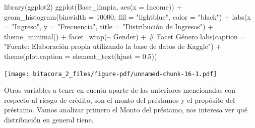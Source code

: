 \documentclass[
  letterpaper,
  DIV=11,
  numbers=noendperiod]{scrreprt}
\newenvironment{Shaded}{\begin{snugshade}}{\end{snugshade}}
\newcommand{\AttributeTok}[1]{\textcolor[rgb]{0.40,0.45,0.13}{#1}}
\newcommand{\CommentTok}[1]{\textcolor[rgb]{0.37,0.37,0.37}{#1}}
\newcommand{\DecValTok}[1]{\textcolor[rgb]{0.68,0.00,0.00}{#1}}
\newcommand{\FloatTok}[1]{\textcolor[rgb]{0.68,0.00,0.00}{#1}}
\newcommand{\FunctionTok}[1]{\textcolor[rgb]{0.28,0.35,0.67}{#1}}
\newcommand{\NormalTok}[1]{\textcolor[rgb]{0.00,0.23,0.31}{#1}}
\newcommand{\SpecialCharTok}[1]{\textcolor[rgb]{0.37,0.37,0.37}{#1}}
\newcommand{\StringTok}[1]{\textcolor[rgb]{0.13,0.47,0.30}{#1}}
\begin{document}
\begin{Shaded}
\begin{Highlighting}[]
\FunctionTok{library}\NormalTok{(ggplot2)}
\FunctionTok{ggplot}\NormalTok{(Base\_limpia, }\FunctionTok{aes}\NormalTok{(}\AttributeTok{x =}\NormalTok{ Income)) }\SpecialCharTok{+} 
  \FunctionTok{geom\_histogram}\NormalTok{(}\AttributeTok{binwidth =} \DecValTok{10000}\NormalTok{, }\AttributeTok{fill =} \StringTok{"lightblue"}\NormalTok{, }\AttributeTok{color =} \StringTok{"black"}\NormalTok{) }\SpecialCharTok{+} 
  \FunctionTok{labs}\NormalTok{(}\AttributeTok{x =} \StringTok{"Ingreso"}\NormalTok{, }\AttributeTok{y =} \StringTok{"Frecuencia"}\NormalTok{, }\AttributeTok{title =} \StringTok{"Distribución de Ingresos"}\NormalTok{) }\SpecialCharTok{+} \FunctionTok{theme\_minimal}\NormalTok{() }\SpecialCharTok{+}
  \FunctionTok{facet\_wrap}\NormalTok{(}\SpecialCharTok{\textasciitilde{}}\NormalTok{ Gender) }\SpecialCharTok{+} \CommentTok{\# Facet Género}
  \FunctionTok{labs}\NormalTok{(}\AttributeTok{caption =} \StringTok{"Fuente: Elaboración propia utilizando la base de datos de Kaggle"}\NormalTok{) }\SpecialCharTok{+}
\FunctionTok{theme}\NormalTok{(}\AttributeTok{plot.caption =} \FunctionTok{element\_text}\NormalTok{(}\AttributeTok{hjust =} \FloatTok{0.5}\NormalTok{)) }
\end{Highlighting}
\end{Shaded}

\texttt{[image: bitacora\_2\_files/figure-pdf/unnamed-chunk-16-1.pdf]}

Otras variables a tener en cuenta aparte de las anteriores mencionadas
con respecto al riesgo de crédito, son el monto del préstamos y el
propósito del préstamo. Vamos analizar primero el Monto del préstamo,
nos interesa ver qué distribución en general tiene.
\end{document}
